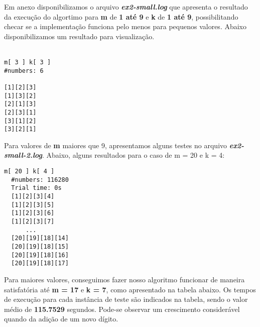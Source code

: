 \documentclass[twoside]{article}
\begin{document}
\begin{multicols}{2}
\indent Em anexo disponibilizamos o arquivo \textbf{\textit{ex2-small.log}} que apresenta o resultado da execução do algortimo para \textbf{m} de \textbf{1 até 9} e \textbf{k} de \textbf{1 até 9}, possibilitando checar se a implementação funciona pelo menos para pequenos valores. Abaixo disponibilizamos um resultado para visualização.\\\\

\begin{lstlisting}
m[ 3 ] k[ 3 ]
#numbers: 6

[1][2][3]
[1][3][2]
[2][1][3]
[2][3][1]
[3][1][2]
[3][2][1]
\end{lstlisting}
\indent Para valores de \textbf{m} maiores que 9, apresentamos alguns testes no arquivo \textbf{\textit{ex2-small-2.log}}. Abaixo, alguns resultados para o caso de m = 20 e k = 4:

\begin{lstlisting}
m[ 20 ] k[ 4 ]
  #numbers: 116280
  Trial time: 0s
  [1][2][3][4]
  [1][2][3][5]
  [1][2][3][6]
  [1][2][3][7]
      ...
  [20][19][18][14]
  [20][19][18][15]
  [20][19][18][16]
  [20][19][18][17]
\end{lstlisting}
\indent Para maiores valores, conseguimos fazer nosso algoritmo funcionar de maneira satisfatória até \textbf{m = 17} e \textbf{k = 7}, como apresentado na tabela abaixo. Os tempos de execução para cada instância de teste são indicados na tabela, sendo o valor médio de \textbf{115.7529} segundos. Pode-se observar um crescimento considerável quando da adição de um novo dígito.\\


\end{multicols}
\end{document}
